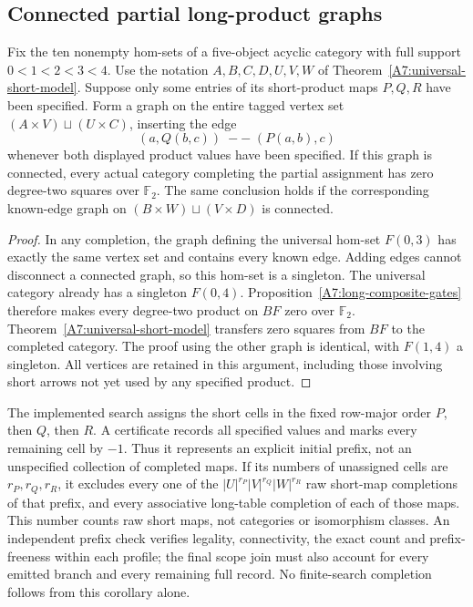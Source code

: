 \subsection{Connected partial long-product graphs}

\begin{corollary}
\label{A7:partial-long-graph}
Fix the ten nonempty hom-sets of a five-object acyclic category
with full support $0<1<2<3<4$.  Use the notation $A,B,C,D,U,V,W$
of Theorem~\ref{A7:universal-short-model}.  Suppose only some
entries of its short-product maps $P,Q,R$ have been specified.
Form a graph on the entire tagged vertex set
$(A\times V)\sqcup(U\times C)$, inserting the edge
\[
 (a,Q(b,c))\;--\;(P(a,b),c)
\]
whenever both displayed product values have been specified.
If this graph is connected, every actual category completing
the partial assignment has zero degree-two squares over
$\mathbb F_2$.  The same conclusion holds if the corresponding
known-edge graph on $(B\times W)\sqcup(V\times D)$ is connected.
\end{corollary}
\begin{proof}
In any completion, the graph defining the universal hom-set
$F(0,3)$ has exactly the same vertex set and contains every
known edge.  Adding edges cannot disconnect a connected graph,
so this hom-set is a singleton.  The universal category already
has a singleton $F(0,4)$.  Proposition~\ref{A7:long-composite-gates}
therefore makes every degree-two product on $BF$ zero over
$\mathbb F_2$.  Theorem~\ref{A7:universal-short-model} transfers
zero squares from $BF$ to the completed category.  The proof
using the other graph is identical, with $F(1,4)$ a singleton.
All vertices are retained in this argument, including those
involving short arrows not yet used by any specified product.
\end{proof}

\begin{remark*}
The implemented search assigns the short cells in the fixed
row-major order $P$, then $Q$, then $R$.  A certificate records
all specified values and marks every remaining cell by $-1$.
Thus it represents an explicit initial prefix, not an
unspecified collection of completed maps.  If its numbers of
unassigned cells are $r_P,r_Q,r_R$, it excludes every one of
the $|U|^{r_P}|V|^{r_Q}|W|^{r_R}$ raw short-map completions of
that prefix, and every associative long-table completion of
each of those maps.  This number counts raw short maps, not
categories or isomorphism classes.  An independent prefix
check verifies legality, connectivity, the exact count and
prefix-freeness within each profile; the final scope join must
also account for every emitted branch and every remaining
full record.  No finite-search completion follows from this
corollary alone.
\end{remark*}
